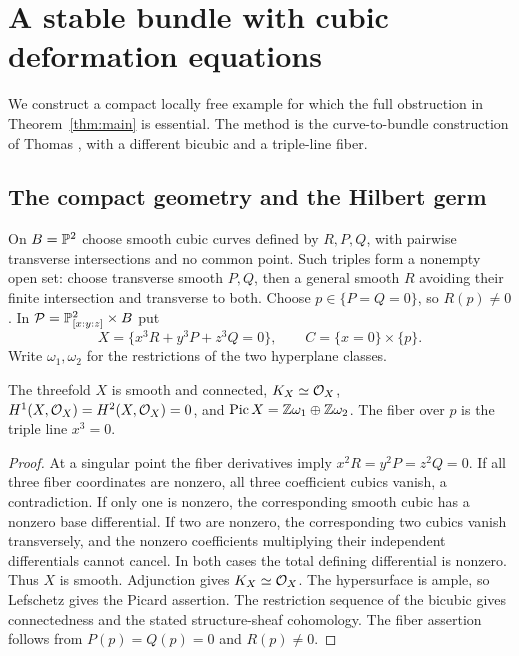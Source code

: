 \section{A stable bundle with cubic deformation equations}\label{sec:bicubic}

We construct a compact locally free example for which the full obstruction
in Theorem~\ref{thm:main} is essential. The method is the
curve-to-bundle construction of Thomas \cite{thomas}, with a different
bicubic and a triple-line fiber.

\subsection{The compact geometry and the Hilbert germ}
On $B=\mathbb P^2$ choose smooth cubic curves defined by $R,P,Q$, with
pairwise transverse intersections and no common point. Such triples
form a nonempty open set: choose transverse smooth $P,Q$, then a
general smooth $R$ avoiding their finite intersection and transverse
to both. Choose $p\in\{P=Q=0\}$, so $R(p)\ne0$. In
$\mathcal P=\mathbb P^2_{[x:y:z]}\times B$ put
\begin{equation}\label{eq:bicubic}
 X=\{x^3R+y^3P+z^3Q=0\},\qquad C=\{x=0\}\times\{p\}.
\end{equation}
Write $\omega_1,\omega_2$ for the restrictions of the two hyperplane
classes.

\begin{lemma}\label{lem:bicubic-smooth}
The threefold $X$ is smooth and connected, $K_X\simeq\mathcal O_X$,
$H^1(X,\mathcal O_X)=H^2(X,\mathcal O_X)=0$, and
$\operatorname{Pic}X=\mathbb Z\omega_1\oplus\mathbb Z\omega_2$.
The fiber over $p$ is the triple line $x^3=0$.
\end{lemma}

\begin{proof}
At a singular point the fiber derivatives imply
$x^2R=y^2P=z^2Q=0$. If all three fiber coordinates are nonzero,
all three coefficient cubics vanish, a contradiction.
If only one is nonzero, the corresponding smooth cubic has a
nonzero base differential. If two are nonzero, the corresponding
two cubics vanish transversely, and the nonzero coefficients
multiplying their independent differentials cannot cancel.
In both cases the total defining differential is nonzero.
Thus $X$ is smooth. Adjunction gives $K_X\simeq\mathcal O_X$.
The hypersurface is ample, so Lefschetz gives the Picard assertion.
The restriction sequence of the bicubic gives connectedness and
the stated structure-sheaf cohomology. The fiber assertion follows
from $P(p)=Q(p)=0$ and $R(p)\ne0$.
\end{proof}

